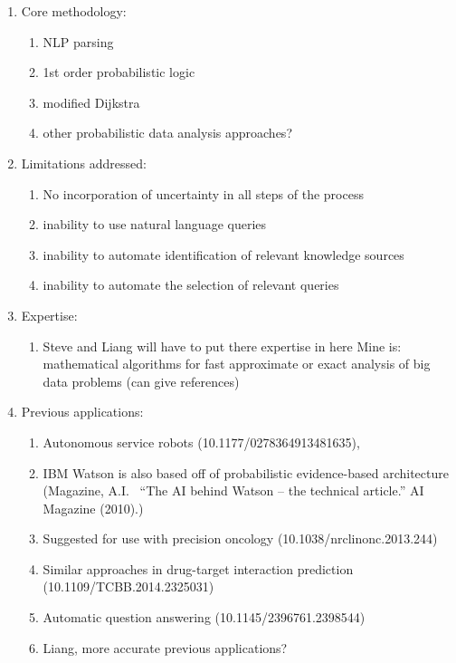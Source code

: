 \documentclass[11pt,notitlepage]{article}
\begin{document}
\begin{enumerate}
 \item Core methodology:
        \begin{enumerate}
        \item  NLP parsing
        \item  1st order probabilistic logic
        \item modified Dijkstra
        \item other probabilistic data analysis approaches?
  		\end{enumerate}
 \item Limitations addressed:
        \begin{enumerate}
        \item No incorporation of uncertainty in all steps of the process
        \item inability to use natural language queries
        \item inability to automate identification of relevant knowledge sources
        \item inability to automate the selection of relevant queries
        \end{enumerate}
 \item Expertise:
 		\begin{enumerate}
        \item Steve and Liang will have to put there expertise in here
        Mine is: mathematical algorithms for fast approximate or exact analysis of big data problems (can give references)
        \end{enumerate}
 \item Previous applications:
 		\begin{enumerate}
        \item Autonomous service robots (10.1177/0278364913481635),
        \item IBM Watson is also based off of probabilistic evidence-based architecture (Magazine, A.I.~ ``The AI behind Watson -- the technical article.'' AI Magazine (2010).)
        \item Suggested for use with precision oncology (10.1038/nrclinonc.2013.244)
        \item Similar approaches in drug-target interaction prediction (10.1109/TCBB.2014.2325031)
        \item Automatic question answering (10.1145/2396761.2398544)
        \item Liang, more accurate previous applications?
        \end{enumerate}
\end{enumerate}
\end{document}
